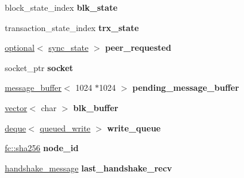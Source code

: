 \begin{DoxyCompactItemize}
\item 
\mbox{\label{classaacio_1_1connection_a4040e6723fe67a47da2464b5796dc8e0}} 
block\+\_\+state\+\_\+index {\bfseries blk\+\_\+state}
\item 
\mbox{\label{classaacio_1_1connection_afd7636e4e9ab39d1427a3a3d7c40dcf3}} 
transaction\+\_\+state\+\_\+index {\bfseries trx\+\_\+state}
\item 
\mbox{\label{classaacio_1_1connection_a38ec6c9242798b957d64c769f3ab2839}} 
\mbox{\hyperlink{classaacio_1_1optional}{optional}}$<$ \mbox{\hyperlink{structaacio_1_1sync__state}{sync\+\_\+state}} $>$ {\bfseries peer\+\_\+requested}
\item 
\mbox{\label{classaacio_1_1connection_af8ea3f88aa10012ccb5166f0942ed942}} 
socket\+\_\+ptr {\bfseries socket}
\item 
\mbox{\label{classaacio_1_1connection_a96821df8369621495fd78f571c84331d}} 
\mbox{\hyperlink{classaacio_1_1message__buffer}{message\+\_\+buffer}}$<$ 1024 $\ast$1024 $>$ {\bfseries pending\+\_\+message\+\_\+buffer}
\item 
\mbox{\label{classaacio_1_1connection_a55e9c1094aa4bbe324f1f94768b85150}} 
\mbox{\hyperlink{classstd_1_1vector}{vector}}$<$ char $>$ {\bfseries blk\+\_\+buffer}
\item 
\mbox{\label{classaacio_1_1connection_a7ed1d9f55d1e39ef6604259b6569fe6f}} 
\mbox{\hyperlink{classstd_1_1deque}{deque}}$<$ \mbox{\hyperlink{structaacio_1_1connection_1_1queued__write}{queued\+\_\+write}} $>$ {\bfseries write\+\_\+queue}
\item 
\mbox{\label{classaacio_1_1connection_a6cda8ff986cb7ad432a82e8a7b842db1}} 
\mbox{\hyperlink{classfc_1_1sha256}{fc\+::sha256}} {\bfseries node\+\_\+id}
\item 
\mbox{\label{classaacio_1_1connection_ac51c6b673c9e4262b75654860c47ffa3}} 
\mbox{\hyperlink{structaacio_1_1handshake__message}{handshake\+\_\+message}} {\bfseries last\+\_\+handshake\+\_\+recv}

\end{DoxyCompactItemize}
